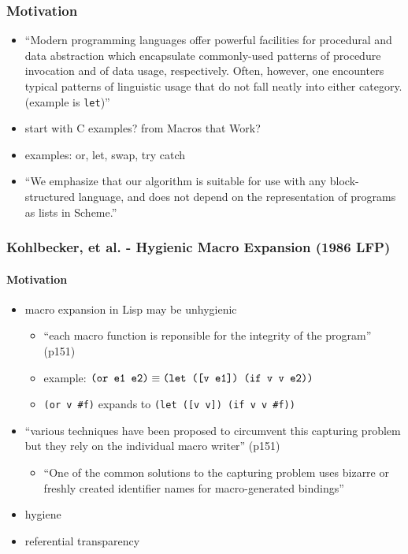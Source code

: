 \documentclass[12pt]{article}	%
\begin{document}
\subsubsection*{Motivation}
\begin{itemize}
	\item ``Modern programming languages offer powerful facilities for procedural and data abstraction which encapsulate commonly-used patterns of procedure invocation and of data usage, respectively. Often, however, one encounters typical patterns of linguistic usage that do not fall neatly into either category. (example is \verb!let!)''~\cite[p77]{Kohlbecker1987Macrobyexample}
	\item start with C examples? from Macros that Work?~\cite{Clinger1991Macros}
	\item examples: or, let, swap, try catch
	\item ``We emphasize that our algorithm is suitable for use with any block-structured language, and does not depend on the representation of programs as lists in Scheme.''~\cite[p161]{Clinger1991Macros}
	\end{itemize}


\subsubsection*{Kohlbecker, et al. - Hygienic Macro Expansion (1986 LFP)}

\paragraph{Motivation}

\begin{itemize}

	\item macro expansion in Lisp may be unhygienic
		\begin{itemize}
			\item ``each macro function is reponsible for the integrity of the program'' (p151)
			\item example: $\verb!(or e1 e2)! \equiv \verb!(let ([v e1]) (if v v e2))!$
			\item \verb!(or v #f)! expands to \verb!(let ([v v]) (if v v #f))!
		\end{itemize}
		
	\item ``various techniques have been proposed to circumvent this capturing problem but they rely on the individual macro writer'' (p151)
		\begin{itemize}
			\item ``One of the common solutions to the capturing problem uses bizarre or freshly created identifier names for macro-generated bindings''
		\end{itemize}
	\item hygiene
	\item referential transparency
\end{itemize}
	
\end{document}
